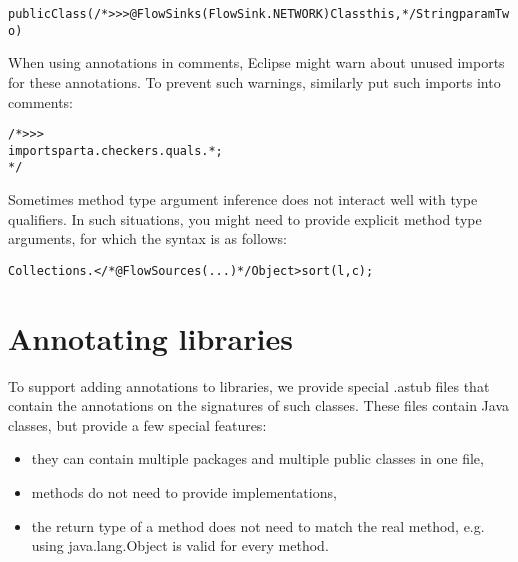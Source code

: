 \begin{alltt}
        public Class(/*>>> @FlowSinks(FlowSink.NETWORK) Class this, */ String paramTwo) {}
\end{alltt}


When using annotations in comments, Eclipse might warn about unused
imports for these annotations. To prevent such warnings, similarly put
such imports into comments:

\begin{alltt}
/*>>>
import sparta.checkers.quals.*;
*/
\end{alltt}


Sometimes method type argument inference does not interact well with
type qualifiers. In such situations, you might need to provide
explicit method type arguments, for which the syntax is as follows:

\begin{alltt}
	Collections.</*@FlowSources({...})*/ Object>sort(l, c);
\end{alltt}


\section{Annotating libraries}

To support adding annotations to libraries, we provide special .astub
files that contain the annotations on the signatures of such classes.
These files contain Java classes, but provide a few special features:
\begin{itemize}
\item they can contain multiple packages and multiple public classes in
 one file,
\item methods do not need to provide implementations,
\item the return type of a method does not need to match the real method,
 e.g. using java.lang.Object is valid for every method.
\end{itemize}

